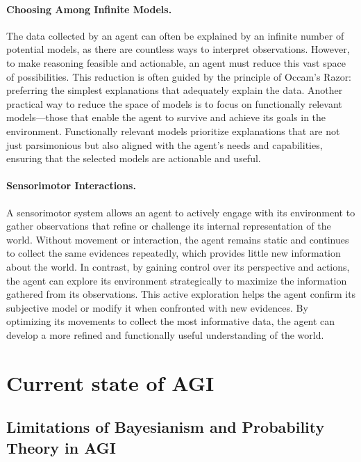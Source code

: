 \documentclass{article}
\begin{document}
\paragraph{Choosing Among Infinite Models.}
The data collected by an agent can often be explained by an infinite number of potential models, as there are countless ways to interpret observations. However, to make reasoning feasible and actionable, an agent must reduce this vast space of possibilities. This reduction is often guided by the principle of Occam's Razor: preferring the simplest explanations that adequately explain the data. Another practical way to reduce the space of models is to focus on functionally relevant models—those that enable the agent to survive and achieve its goals in the environment. Functionally relevant models prioritize explanations that are not just parsimonious but also aligned with the agent's needs and capabilities, ensuring that the selected models are actionable and useful.


\paragraph{Sensorimotor Interactions.}
A sensorimotor system allows an agent to actively engage with its environment to gather observations that refine or challenge its internal representation of the world. Without movement or interaction, the agent remains static and continues to collect the same evidences repeatedly, which provides little new information about the world. In contrast, by gaining control over its perspective and actions, the agent can explore its environment strategically to maximize the information gathered from its observations. This active exploration helps the agent confirm its subjective model or modify it when confronted with new evidences. By optimizing its movements to collect the most informative data, the agent can develop a more refined and functionally useful understanding of the world.


\section{Current state of AGI}

\subsection{Limitations of Bayesianism and Probability Theory in AGI}
\end{document}
